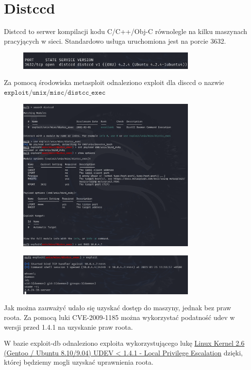\documentclass{article}
\begin{document}
\section*{Distccd}
Distccd to serwer kompilacji kodu C/C++/Obj-C równolegle na kilku maszynach pracyjących w sieci. Standardowo usługa uruchomiona jest na porcie 3632.
\begin{figure}[H]
    \centering
    \includegraphics[width=0.8\textwidth]{distccd.png}
\end{figure}
Za pomocą środowiska metasploit odnaleziono exploit dla disccd o nazwie $\texttt{exploit/unix/misc/distcc\_exec}$
\begin{figure}[H]
    \centering
    \includegraphics[width=0.8\textwidth]{explot.png}
\end{figure}
\begin{figure}[H]
    \centering
    \includegraphics[width=0.8\textwidth]{explot_id_uname.png}
\end{figure}
Jak można zauważyć udało się uzyskać dostęp do maszyny, jednak bez praw roota.
Za pomocą luki CVE-2009-1185 można wykorzystać podatność udev w wersji przed 1.4.1 na uzyskanie praw roota.

W bazie exploit-db odnaleziono exploita wykorzystującego lukę \href{https://www.exploit-db.com/exploits/8572}{Linux Kernel 2.6 (Gentoo / Ubuntu 8.10/9.04) UDEV < 1.4.1 - Local Privilege Escalation} dzięki, której
będziemy mogli uzyskać uprawnienia roota.
\end{document}
